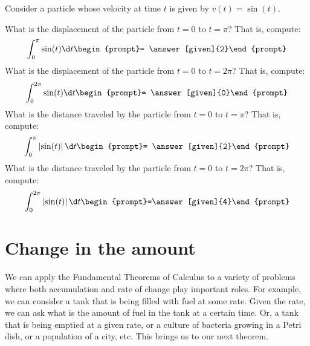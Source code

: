 \documentclass{ximera}
\begin{document}
\begin{question}
  Consider a particle whose velocity at time $t$ is given by $v(t) = \sin(t)$.

\begin{image}
\end{image}
What is the displacement of the particle from $t=0$ to $t=\pi$? That
is, compute:
\[
\int_0^\pi \sin(t) \d t \begin{prompt}= \answer[given]{2}\end{prompt}
\]
What is the displacement of the particle from $t=0$ to $t=2\pi$? That is, compute:
\[
\int_0^{2\pi} \sin(t) \d t \begin{prompt}= \answer[given]{0}\end{prompt}
\]
What is the distance traveled by the particle from $t=0$ to $t=\pi$?
That is, compute:
\[
\int_0^\pi  \left| \sin(t) \right|  \d t \begin{prompt}= \answer[given]{2}\end{prompt}
\]
What is the distance traveled by the particle from $t=0$ to $t=2\pi$?
That is, compute:
\[
\int_0^{2\pi} \left| \sin(t) \right| \d t \begin{prompt}=\answer[given]{4}\end{prompt}
\]
\end{question}

\section{ Change in the  amount }

We can apply the Fundamental Theorems of Calculus to a variety of problems where both accumulation and rate of change play important roles.
For example, we can consider a tank that is being filled with fuel at some rate. Given the rate, we can ask what is the amount of fuel in the tank  at a  certain time.
Or, a tank that is being emptied at a given rate, or  a culture of bacteria growing in a Petri dish, or a  population of a city, etc.
This brings us to our next theorem.
\end{document}
